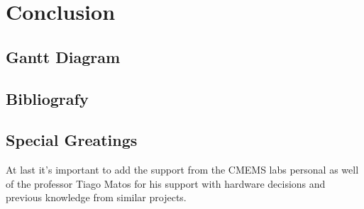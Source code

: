 \chapter{Conclusion}
\section{Gantt Diagram}
\section{Bibliografy}
\section{Special Greatings}
At last it's important to add the support from the 
CMEMS labs personal as well of the professor Tiago Matos for his support with hardware
decisions and previous knowledge from similar projects.